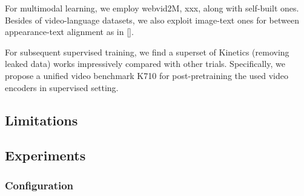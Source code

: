 For multimodal learning, we employ webvid2M, xxx, along with self-built ones. Besides of video-language datasets, we also exploit image-text ones for between appearance-text alignment as in []. 

For subsequent supervised training, we find a superset of Kinetics (removing leaked data) works impressively compared with other trials. Specifically, we propose a unified video benchmark K710 for post-pretraining the used video encoders in supervised setting. 

%

%










\subsection{Limitations}

\subsection{Experiments}
\subsubsection{Configuration}
\subsubsection{}
